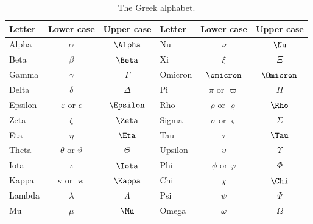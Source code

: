 \documentclass[fleqn]{LectureClass/LectureClass}
\begin{document}
    \begin{table}
        \caption[The Greek alphabet.]{The Greek alphabet.}
        \label{tab:greek alphabet}
        \begin{tabular}{lcclcc}
            \toprule
            Letter & Lower case & Upper case & Letter & Lower case & Upper case\\
            \midrule
            Alpha & \(\alpha\) & \(\Alpha\) & Nu & \(\nu\) & \(\Nu\)\\
            Beta & \(\beta\) & \(\Beta\) & Xi & \(\xi\) & \(\Xi\)\\
            Gamma & \(\gamma\) & \(\Gamma\) & Omicron & \(\omicron\) & \(\Omicron\)\\
            Delta & \(\delta\) & \(\Delta\) & Pi & \(\pi\) or \(\varpi\) & \(\Pi\)\\
            Epsilon & \(\varepsilon\) or \(\epsilon\) & \(\Epsilon\) & Rho & \(\rho\) or \(\varrho\) & \(\Rho\)\\
            Zeta & \(\zeta\) & \(\Zeta\) & Sigma & \(\sigma\) or \(\varsigma\) & \(\Sigma\)\\
            Eta & \(\eta\) & \(\Eta\) & Tau & \(\tau\) & \(\Tau\)\\
            Theta & \(\theta\) or \(\vartheta\) & \(\Theta\) & Upsilon & \(\upsilon\) & \(\Upsilon\)\\
            Iota & \(\iota\) & \(\Iota\) & Phi & \(\phi\) or \(\varphi\) & \(\Phi\)\\
            Kappa & \(\kappa\) or \(\varkappa\) & \(\Kappa\) & Chi & \(\chi\) & \(\Chi\)\\
            Lambda & \(\lambda\) & \(\Lambda\) & Psi & \(\psi\) & \(\Psi\)\\
            Mu & \(\mu\) & \(\Mu\) & Omega & \(\omega\) & \(\Omega\)\\
            \bottomrule
        \end{tabular}
    \end{table}
    
\end{document}
